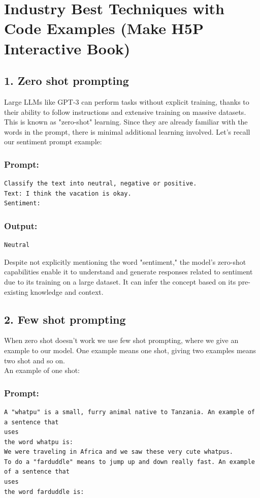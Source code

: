 \documentclass[10pt]{article}
\begin{document}
\section*{Industry Best Techniques with Code Examples (Make H5P Interactive Book)}
\subsection*{1. Zero shot prompting}
Large LLMs like GPT-3 can perform tasks without explicit training, thanks to their ability to follow instructions and extensive training on massive datasets. This is known as "zero-shot" learning. Since they are already familiar with the words in the prompt, there is minimal additional learning involved. Let's recall our sentiment prompt example:

\subsubsection*{Prompt:}
\begin{verbatim}
Classify the text into neutral, negative or positive.
Text: I think the vacation is okay.
Sentiment:
\end{verbatim}

\subsubsection*{Output:}
\begin{verbatim}
Neutral
\end{verbatim}

Despite not explicitly mentioning the word "sentiment," the model's zero-shot capabilities enable it to understand and generate responses related to sentiment due to its training on a large dataset. It can infer the concept based on its pre-existing knowledge and context.

\subsection*{2. Few shot prompting}
When zero shot doesn't work we use few shot prompting, where we give an example to our model. One example means one shot, giving two examples means two shot and so on.\\
An example of one shot:

\subsubsection*{Prompt:}
\begin{verbatim}
A "whatpu" is a small, furry animal native to Tanzania. An example of a sentence that
uses
the word whatpu is:
We were traveling in Africa and we saw these very cute whatpus.
To do a "farduddle" means to jump up and down really fast. An example of a sentence that
uses
the word farduddle is:
\end{verbatim}
\end{document}
